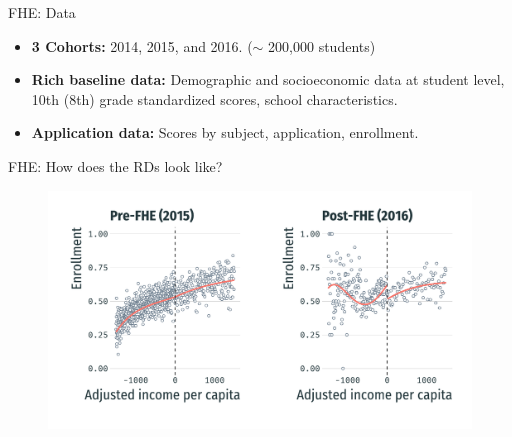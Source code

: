 \documentclass[usenames,dvipsnames,11pt,aspectratio=169]{beamer}
\begin{document}
\begin{frame}{FHE: Data}

\begin{itemize}
\item \textbf{3 Cohorts:} 2014, 2015, and 2016. ($\sim$ 200,000 students)
    \vspace{0.1cm}
\item \textbf{Rich baseline data:} Demographic and socioeconomic data at student level, 10th (8th) grade standardized scores, school characteristics.
    \vspace{0.1cm}
\item \textbf{Application data:} Scores by subject, application, enrollment.
\end{itemize}

\end{frame}

\begin{frame}{FHE: How does the RDs look like?}
\begin{figure}[!htb]
\centering
    \includegraphics[width=\textwidth]{figures/fhe_h.pdf}
\end{figure}
\end{frame}
\end{document}
